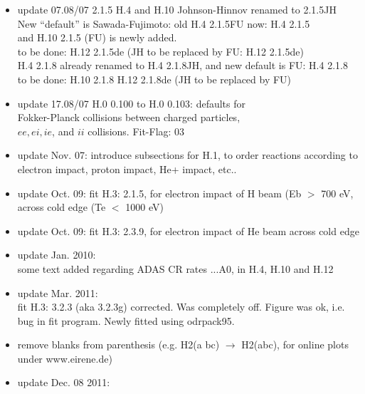 \documentclass[12pt,dvipdfmx]{article}
\begin{document}
\begin{itemize}
  remove $d(ln\langle sigv\rangle)/d(ln T)$ corrections in free-bound transition\\
  then: good agreement with ADAS PRB found (tested for JET divertor case)\\
  hence: this correction seemed to be missing in ADAS\\
  Also added: H.12 2.1.8de-t, (DE per event) and figures \\
  Old H.12 2.1.5t and 2.1.8t renamed into 2.1.5tot and 2.1.8tot, resp.
  Sept. 18: The intermediate "test fits" H.10 2.1.8-t, H.12 2-1-8de-t from 2007 removed now.
  \item update   07.08/07  2.1.5 H.4 and H.10 Johnson-Hinnov renamed to 2.1.5JH\\
  New ``default'' is Sawada-Fujimoto: old H.4 2.1.5FU now: H.4 2.1.5\\
  and H.10 2.1.5  (FU) is newly added.\\
  to be done: H.12 2.1.5de  (JH to be replaced by FU: H.12 2.1.5de)\\
  H.4 2.1.8 already renamed to H.4 2.1.8JH, and new default is FU: H.4 2.1.8\\
  to be done: H.10 2.1.8 H.12 2.1.8de  (JH to be replaced by FU)
  \item update   17.08/07  H.0 0.100 to H.0 0.103: defaults for \\
  Fokker-Planck collisions between charged particles,\\
  $ee, ei, ie$, and $ii$ collisions. Fit-Flag: 03
  \item update Nov. 07:  introduce subsections for H.1, to order
  reactions according to electron impact, proton impact, He+ impact, etc..
  \item update Oct. 09:  fit H.3: 2.1.5, for electron impact
  of H beam (Eb $>$ 700 eV, across cold edge (Te $<$ 1000 eV)
  \item update Oct. 09:  fit H.3: 2.3.9, for electron impact
  of He beam across cold edge
  \item update Jan. 2010: \\
  some text added regarding ADAS CR rates
  ...A0, in H.4, H.10 and H.12
  \item update Mar. 2011:  \\
  fit H.3: 3.2.3 (aka 3.2.3g) corrected. Was completely off.
  Figure was ok, i.e. bug in fit program. Newly fitted using odrpack95.
  \item remove blanks from parenthesis (e.g. H2(a bc) $\rightarrow$ H2(abc), for online plots under www.eirene.de)
  \item update Dec. 08 2011:  \\

\end{itemize}
\end{document}
